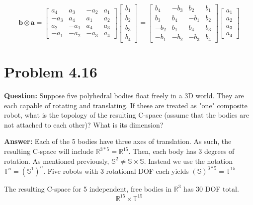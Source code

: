 \documentclass[10pt,letterpaper]{article}
\begin{document}
\begin{equation*}
\mathbf{b}\otimes\mathbf{a} =
\left[ {\begin{array}{rrrr}
    a_4 &   a_3 & -a_2 &  a_1\\
   -a_3 &   a_4 &  a_1 &  a_2\\
    a_2 &  -a_1 &  a_4 &  a_3\\
   -a_1 &  -a_2 & -a_3 &  a_4
\end{array}} \right]
\left[ {\begin{array}{c}
   b_1\\
   b_2\\
   b_3\\
   b_4
\end{array}} \right] =
\left[ {\begin{array}{rrrr}
    b_4 &  -b_3 &  b_2 &  b_1\\
    b_3 &   b_4 & -b_1 &  b_2\\
   -b_2 &   b_1 &  b_4 &  b_3\\
   -b_1 &  -b_2 & -b_3 &  b_4
\end{array}} \right]
\left[ {\begin{array}{c}
   a_1\\
   a_2\\
   a_3\\
   a_4
\end{array}} \right]
\end{equation*}



\section{Problem 4.16}
\textbf{Question: } Suppose five polyhedral bodies float freely in a 3D world. They are each capable of rotating and translating. If these are treated as "one" composite robot, what is the topology of the resulting C-space (assume that the bodies are not attached to each other)? What is its dimension?
 
\textbf{Answer: } Each of the 5 bodies have three axes of translation. As such, the resulting C-space will include $\mathbb{R}^{3*5} = \mathbb{R}^{15}$. Then, each body has 3 degrees of rotation. As mentioned previously, $\mathbb{S}^2 \neq \mathbb{S} \times \mathbb{S}$. Instead we use the notation $\mathbb{T}^n = (\mathbb{S}^1)^n$. Five robots with 3 rotational DOF each yields $(\mathbb{S})^{3*5} = \mathbb{T}^{15}$

The resulting C-space for 5 independent, free bodies in $\mathbb{R}^3$ has 30 DOF total. 
\begin{equation}
\mathbb{R}^{15} \times \mathbb{T}^{15}
\end{equation}
\end{document}
